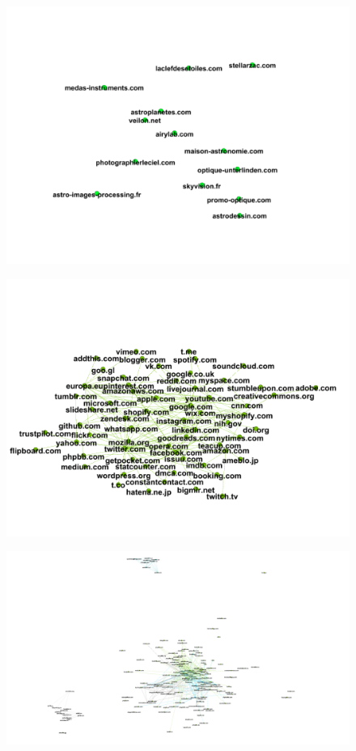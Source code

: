 \documentclass[conference]{IEEEtran}
\begin{document}
\begin{figure}[htbp]
 \centerline{\includegraphics[width=\columnwidth]{figs/astro.png}}
 \caption{}
\end{figure}

\begin{figure}[htbp]
 \centerline{\includegraphics[width=\columnwidth]{figs/google.png}}
 \caption{}
\end{figure}

\begin{figure}[htbp]
 \centerline{\includegraphics[width=\columnwidth]{figs/Huge.png}}
 \caption{}
\end{figure}
\end{document}
